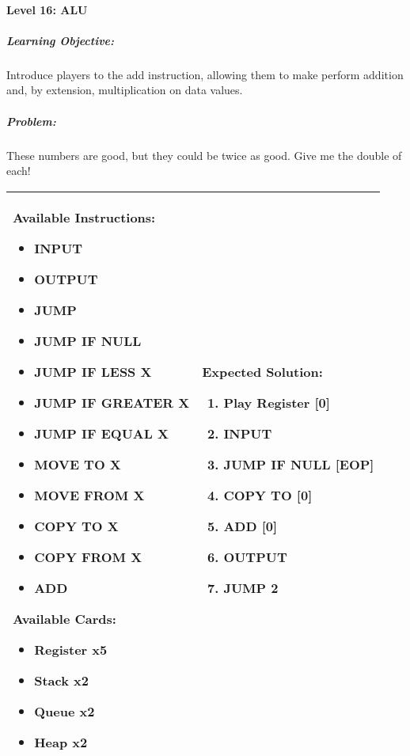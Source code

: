 \paragraph{Level 16: ALU}
\subparagraph{Learning Objective:} Introduce players to the add instruction, allowing them to make perform addition and, by extension, multiplication on data values.

\subparagraph{Problem:} These numbers are good, but they could be twice as good. Give me the double of each!

\begin{center}
    \begin{tabular}{ | m{5cm} | m{9cm} | } 
        \hline
            \textbf{Available Instructions:} 
            \begin{itemize}
                \setlength\itemsep{-.35em}
                \item INPUT
                \item OUTPUT
                \item JUMP
                \item JUMP IF NULL
                \item JUMP IF LESS X
                \item JUMP IF GREATER X
		\item JUMP IF EQUAL X
                \item MOVE TO X
                \item MOVE FROM X
                \item COPY TO X
                \item COPY FROM X
		\item ADD
            \end{itemize}
            \textbf{Available Cards:} 
            \begin{itemize}
                \setlength\itemsep{-.35em}
                \item Register x5
		\item Stack x2
                \item Queue x2
                \item Heap x2
            \end{itemize}& 
            \textbf{Expected Solution:} 
            \begin{enumerate}
                \setlength\itemsep{-.35em}
		\item Play Register [0]
                \item INPUT
		\item JUMP IF NULL [EOP]
		\item COPY TO [0]
		\item ADD [0]
		\item OUTPUT
		\item JUMP 2
            \end{enumerate}
            \\
        \hline
    \end{tabular}
\end{center}


